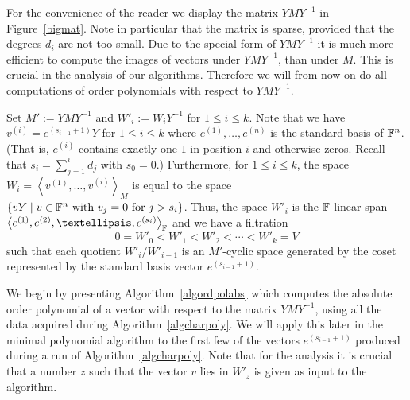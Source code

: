 For the convenience of the reader we display the matrix
$YMY^{-1}$ in Figure~\ref{bigmat}. Note in particular that the matrix is
sparse, provided that the degrees $d_i$ are not too small.
Due to the special form of $YMY^{-1}$ it is much more efficient to compute
the images of vectors under $YMY^{-1}$, than under $M$. 
This is crucial in the analysis of our algorithms. 
Therefore we will from now on do all computations of order polynomials
with respect to $YMY^{-1}$.

Set $M' := YMY^{-1}$ and $W'_i := W_i Y^{-1}$ for $1 \le i \le k$.
Note that we have $v^{(i)} = e^{(s_{i-1}+1)} Y$ for $1 \le i \le k$
where $e^{(1)}, \ldots, e^{(n)}$ is the standard basis of $\mathbb{F}^n$. (That is,  
 $e^{(i)}$ contains exactly one $1$ in position $i$ and otherwise zeros. Recall
that $s_i = \sum_{j=1}^i d_j$ with $s_0 = 0$.) Furthermore, for $1 \le i \le k$,
the space $W_i = \left< v^{(1)}, \ldots, v^{(i)} \right>_M$ is equal to the space
$\{ vY \mid v \in \mathbb{F}^n \mbox{ with } v_j = 0 \mbox{ for } j > s_i \}$. 
Thus, the space $W'_i$ is the $\mathbb{F}$-linear
span $\left< e^{(1)}, e^{(2)}, \ldots, e^{(s_i)}\right>_\F$ and we have a
filtration
\[ 0 = W'_0 < W'_1 < W'_2 < \cdots < W'_k = V \]
such that each quotient $W'_i/W'_{i-1}$ is an $M'$-cyclic space generated 
by the coset represented by the standard basis vector $e^{(s_{i-1}+1)}$.

We begin by presenting Algorithm~\ref{algordpolabs} which computes the
absolute order polynomial of a vector with respect to the matrix $YMY^{-1}$,
using all the data acquired during Algorithm~\ref{algcharpoly}. 
We will apply this later
in the minimal polynomial algorithm to the first few of the vectors 
$e^{(s_{i-1}+1)}$ 
produced during a run of Algorithm~\ref{algcharpoly}. Note that for 
the analysis it is crucial that a number $z$ such that
the vector $v$ lies in $W'_z$ 
is given as input to the algorithm.

